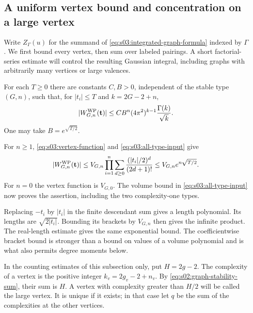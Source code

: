 \subsection{A uniform vertex bound and concentration on a large vertex}
\label{subsec:s03:03}

Write $Z_\Gamma(u)$ for the summand of
\eqref{eq:s03:integrated-graph-formula} indexed by $\Gamma$.
We first bound every vertex, then sum over labeled pairings. A short
factorial-series estimate will control the resulting Gaussian integral,
including graphs with arbitrarily many vertices or large valences.

\begin{lmm}
\label{lmm:s03:vertex-bound}
For each $T\geq0$ there are constants $C,B>0$, independent of the
stable type $(G,n)$, such that, for $|t_i|\leq T$ and $k=2G-2+n$,
\begin{equation}
\label{eq:s03:vertex-bound}
|W^{\rm WP}_{G,n}(\mathbf t)|
\leq CB^n(4\pi^2)^{k-1}\frac{\Gamma(k)}{\sqrt{k}}.
\end{equation}
One may take $B=e^{\sqrt{T/2}}$.
\end{lmm}
\begin{prf}
For $n\geq1$, \eqref{eq:s03:vertex-function} and
\eqref{eq:s03:all-type-input} give
\[
|W^{\rm WP}_{G,n}(\mathbf t)|
\leq V_{G,n}\prod_{i=1}^n
 \sum_{d\geq0}\frac{(|t_i|/2)^d}{(2d+1)!}
\leq V_{G,n}e^{n\sqrt{T/2}}.
\]
For $n=0$ the vertex function is $V_{G,0}$. The volume bound in
\eqref{eq:s03:all-type-input} now proves the assertion, including
the two complexity-one types.
\end{prf}

\begin{rmk}
Replacing $-t_i$ by $|t_i|$ in the finite descendant sum gives a
length polynomial. Its lengths are $\sqrt{2|t_i|}$.
Bounding its brackets by $V_{G,n}$ then gives the infinite product.
The real-length estimate
\cite[Lemma~14(1)]{SW25} gives the same exponential bound.
The coefficientwise bracket bound is stronger than a bound on values
of a volume polynomial and is what also permits degree moments below.
\end{rmk}

In the counting estimates of this subsection only, put $H=2g-2$.
The complexity of a vertex is the positive integer $k_v=2g_v-2+n_v$.
By \eqref{eq:s02:graph-stability-sum}, their sum is $H$.
A vertex with complexity greater than $H/2$ will be called the large
vertex. It is unique if it exists; in that case let $q$ be the sum
of the complexities at the other vertices.

